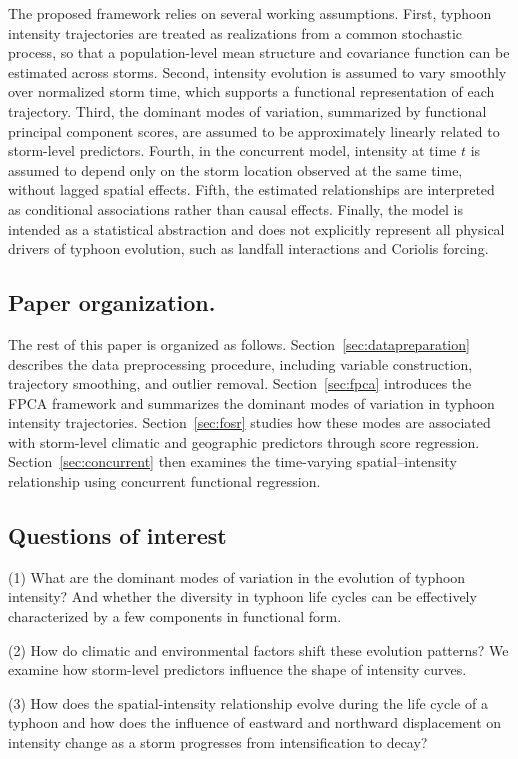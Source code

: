 \documentclass{article}
\begin{document}
The proposed framework relies on several working assumptions. 
First, typhoon intensity trajectories are treated as realizations from a common stochastic process, so that a population-level mean structure and covariance function can be estimated across storms. 
Second, intensity evolution is assumed to vary smoothly over normalized storm time, which supports a functional representation of each trajectory. 
Third, the dominant modes of variation, summarized by functional principal component scores, are assumed to be approximately linearly related to storm-level predictors. 
Fourth, in the concurrent model, intensity at time $t$ is assumed to depend only on the storm location observed at the same time, without lagged spatial effects. 
Fifth, the estimated relationships are interpreted as conditional associations rather than causal effects. 
Finally, the model is intended as a statistical abstraction and does not explicitly represent all physical drivers of typhoon evolution, such as landfall interactions and Coriolis forcing.

\subsection{Paper organization.}
The rest of this paper is organized as follows. Section~\ref{sec:datapreparation} describes the data preprocessing procedure, including variable construction, trajectory smoothing, and outlier removal. Section~\ref{sec:fpca} introduces the FPCA framework and summarizes the dominant modes of variation in typhoon intensity trajectories. Section~\ref{sec:fosr} studies how these modes are associated with storm-level climatic and geographic predictors through score regression. Section~\ref{sec:concurrent} then examines the time-varying spatial--intensity relationship using concurrent functional regression.

\subsection{Questions of interest}
\label{sec:questionofinterests}
(1) What are the dominant modes of variation in the evolution of typhoon intensity?
And whether the diversity in typhoon life cycles can be effectively characterized by a few components in functional form.

(2) How do climatic and environmental factors shift these evolution patterns?
We examine how storm-level predictors influence the shape of intensity curves. 

(3) How does the spatial-intensity relationship evolve during the life cycle of a typhoon and how does the influence of eastward and northward displacement on intensity change as a storm progresses from intensification to decay?
\end{document}

